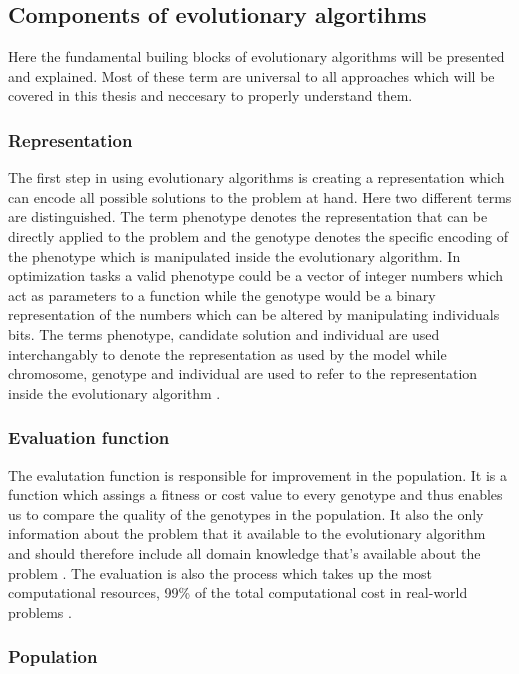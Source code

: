 \subsection{Components of evolutionary algortihms}

Here the fundamental builing blocks of evolutionary algorithms will be presented and explained. Most of these term are universal to all approaches which will be covered in this thesis and neccesary to properly understand them.

\subsubsection{Representation}

The first step in using evolutionary algorithms is creating a representation which can encode all possible solutions to the problem at hand. Here two different terms are distinguished. The term phenotype denotes the representation that can be directly applied to the problem and the genotype denotes the specific encoding of the phenotype which is manipulated inside the evolutionary algorithm. In optimization tasks a valid phenotype could be a vector of integer numbers which act as parameters to a function while the genotype would be a binary representation of the numbers which can be altered by manipulating individuals bits. The terms phenotype, candidate solution and individual are used interchangably to denote the representation as used by the model while chromosome, genotype and individual are used to refer to the representation inside the evolutionary algorithm \cite{Eiben2015_whatevolutionary}.

\subsubsection{Evaluation function}

The evalutation function is responsible for improvement in the population. It is a function which assings a fitness or cost value to every genotype and thus enables us to compare the quality of the genotypes in the population. It also the only information about the problem that it available to the evolutionary algorithm and should therefore include all domain knowledge that's available about the problem \cite{Eiben2015_whatevolutionary}. The evaluation is also the process which takes up the most computational resources, 99\% of the total computational cost in real-world problems \cite{Eiben20021}.

\subsubsection{Population}

